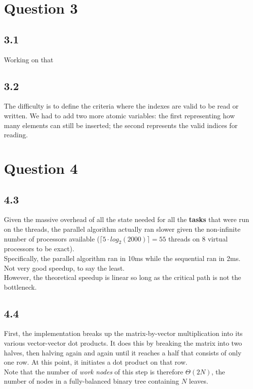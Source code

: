 \documentclass[11pt, letterpaper]{article}
\begin{document}
\section*{Question 3}
\subsection*{3.1}
Working on that
\subsection*{3.2}
The difficulty is to define the criteria where the indexes are valid to be read or written. We had to add two more atomic variables: the first representing how many elements can still be inserted; the second represents the valid indices for reading.

\newpage
\section*{Question 4}

\subsection*{4.3}
Given the massive overhead of all the state needed for all the \textbf{tasks} that were run on the threads, the parallel algorithm actually ran slower given the non-infinite number of processors available ($\lceil5 \cdot log_2(2000)\rceil = 55$ threads on 8 virtual processors to be exact).\\

Specifically, the parallel algorithm ran in 10ms while the sequential ran in 2ms. Not very good speedup, to say the least.\\

However, the theoretical speedup is linear so long as the critical path is not the bottleneck.

\subsection*{4.4}
First, the implementation breaks up the matrix-by-vector multiplication into its various vector-vector dot products. It does this by breaking the matrix into two halves, then halving again and again until it reaches a half that consists of only one row. At this point, it initiates a dot product on that row.\\

Note that the number of \textit{work nodes} of this step is therefore $\Theta(2N)$, the number of nodes in a fully-balanced binary tree containing $N$ leaves.\\
\end{document}
